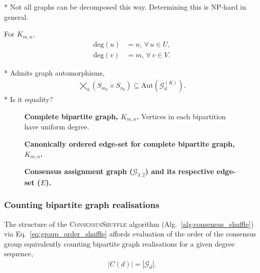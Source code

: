 * Not all graphs can be decomposed this way. Determining this is NP-hard in general.

For $K_{m,n}$,
\begin{align}
	\mathrm{deg}(u) & =n,\,\forall\, u\in U,\nonumber \\
	\mathrm{deg}(v) & =m,\,\forall\, v\in V.
\end{align}

* Admits graph automorphisms,
\begin{align}
	\bigtimes_{b} (S_{m_b}\times S_{n_b}) \subseteq \mathrm{Aut}(\mathcal{G}_d^{(K)}).
\end{align}
* Is it equality?

\begin{figure}[!htb]
	
	\caption{\textbf{Complete bipartite graph, $K_{m,n}$.} Vertices in each bipartition have uniform degree.} \label{fig:K_mn_graph}
\end{figure}

\begin{figure}[!htb]
	
	\caption{\textbf{Canonically ordered edge-set for complete bipartite graph, $K_{m,n}$.}} \label{fig:K_mn_edges}
\end{figure}

\begin{figure}[!htb]
\centering
	\begin{minipage}[t]{0.4\columnwidth}
		
	\end{minipage}
	\quad
	\begin{minipage}[t]{0.3\columnwidth}
		
	\end{minipage}
	\caption{\textbf{Consensus assignment graph ($\mathcal{G}_{3,2}$) and its respective edge-set ($E$).}} \label{fig:G_32_edges}
\end{figure}

\subsubsection{Counting bipartite graph realisations} \label{sec:count_real}

The structure of the \textsc{ConsensusShuffle} algorithm (Alg.~\ref{alg:consensus_shuffle}) via Eq.~\eqref{eq:group_order_shuffle} affords evaluation of the order of the consensus group equivalently counting bipartite graph realisations for a given degree sequence,
\begin{align}
	|C(d)| = |\mathcal{G}_d|.
\end{align}

